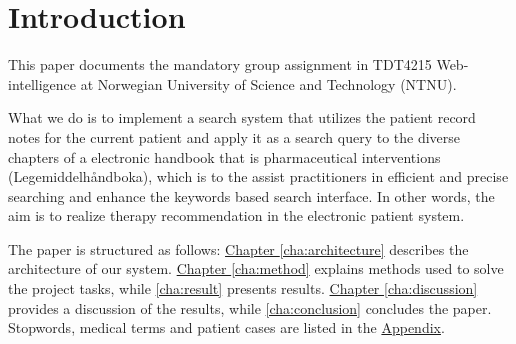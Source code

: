 \chapter{Introduction}
This paper documents the mandatory group assignment in TDT4215 Web-intelligence
at Norwegian University of Science and Technology (NTNU).

What we do is to implement a search system that utilizes the patient record notes for the current patient and apply it as a search query to the diverse chapters of a electronic handbook that is pharmaceutical interventions (Legemiddelhåndboka), which is to the assist practitioners in efficient and precise searching  and  enhance the keywords based search interface. In other words, the aim is to realize therapy recommendation in the electronic patient system.

The paper is structured as follows:
\hyperref[cha:architecture]{Chapter \ref*{cha:architecture}} describes the
architecture of our system.
\hyperref[cha:method]{Chapter \ref*{cha:method}} explains methods used to
solve the project tasks, while \autoref{cha:result} presents results.
\hyperref[cha:discussion]{Chapter \ref*{cha:discussion}} provides a discussion
of the results, while \autoref{cha:conclusion} concludes the paper.
Stopwords, medical terms and patient cases are listed in the
\hyperref[appendix]{Appendix}.
